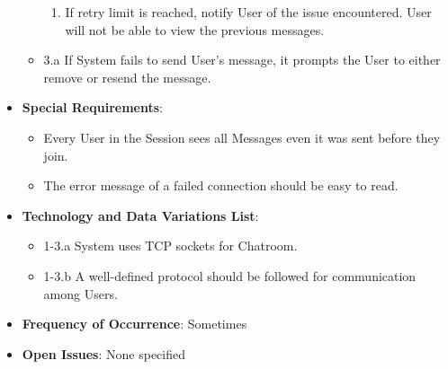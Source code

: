 \documentclass[12pt]{article}
\begin{document}
\begin{itemize}
\begin{itemize}
            \begin{enumerate}
                \item If retry limit is reached, notify User of the issue encountered. User will not be able to view the previous messages.
            \end{enumerate}
            \item 3.a If System fails to send User's message, it prompts the User to either remove or resend the message.
        \end{itemize}
        \item \textbf{Special Requirements}:
        \begin{itemize}
            \item Every User in the Session sees all Messages even it was sent before they join.
            \item The error message of a failed connection should be easy to read.
        \end{itemize}
        \item \textbf{Technology and Data Variations List}:
        \begin{itemize}
            \item 1-3.a System uses TCP sockets for Chatroom.
            \item 1-3.b A well-defined protocol should be followed for communication among Users.
        \end{itemize}
        \item \textbf{Frequency of Occurrence}: Sometimes
        \item \textbf{Open Issues}: None specified
    \end{itemize}
\end{document}

